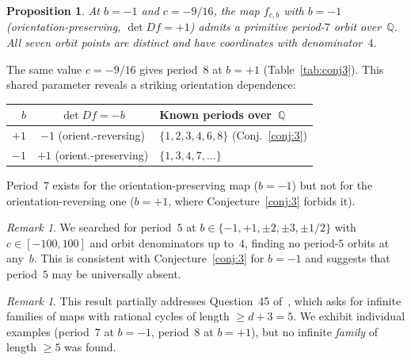 \documentclass[11pt]{article}
\newtheorem{proposition}[theorem]{Proposition}
\theoremstyle{definition}
\theoremstyle{remark}
\newtheorem{remark}[theorem]{Remark}
\begin{document}
\begin{proposition}\label{prop:period7}
  At $b = -1$ and $c = -9/16$, the map $f_{c,b}$ with $b = -1$
  (orientation-preserving, $\det Df = +1$)
  admits a primitive period-$7$
  orbit over~$\mathbb{Q}$.  All seven orbit points are distinct and have
  coordinates with denominator~$4$.
\end{proposition}

The same value $c = -9/16$ gives period~$8$ at $b = +1$
(Table~\ref{tab:conj3}).  This shared parameter reveals a striking
orientation dependence:

\begin{center}
\begin{tabular}{@{} rcl @{}}
  \toprule
  $b$ & $\det Df = -b$ & Known periods over~$\mathbb{Q}$ \\
  \midrule
  $+1$ & $-1$ (orient.-reversing) & $\{1, 2, 3, 4, 6, 8\}$ (Conj.~\ref{conj:3}) \\
  $-1$ & $+1$ (orient.-preserving) & $\{1, 3, 4, 7, \ldots\}$ \\
  \bottomrule
\end{tabular}
\end{center}

Period~$7$ exists for the orientation-preserving map ($b = -1$) but not
for the orientation-reversing one ($b = +1$, where Conjecture~\ref{conj:3}
forbids it).

\begin{remark}
  We searched for period~$5$ at $b \in \{-1, +1, \pm 2, \pm 3, \pm 1/2\}$
  with $c \in [-100, 100]$ and orbit denominators up to~$4$, finding no
  period-$5$ orbits at any~$b$.  This is consistent with Conjecture~\ref{conj:3}
  for $b = -1$ and suggests that period~$5$ may be universally absent.
\end{remark}

\begin{remark}
  This result partially addresses Question~45 of~\cite{berger2024},
  which asks for infinite families of maps with rational cycles of length
  $\geq d + 3 = 5$.  We exhibit individual examples (period~$7$ at $b = -1$,
  period~$8$ at $b = +1$), but no infinite \emph{family} of length $\geq 5$
  was found.
\end{remark}
\end{document}
